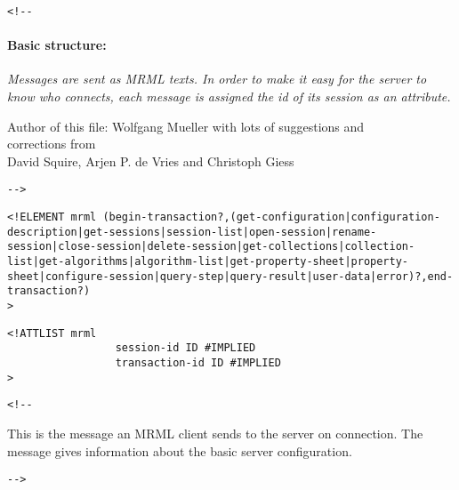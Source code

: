 
\begin{verbatim}<!--\end{verbatim}
  
       \paragraph{Basic structure:}
       {\em
       Messages are sent as MRML texts.
       In  order to make it easy for the server to know who connects,
       each message is assigned the id of its session as an attribute.
       }

     \begin{center}
      Author of this file: 
      Wolfgang Mueller with lots of suggestions and \\
                                   corrections from \\
      David Squire, Arjen P. de Vries and Christoph Giess \\
     \end{center}
       
 \begin{verbatim}-->\end{verbatim}



\begin{verbatim}
<!ELEMENT mrml (begin-transaction?,(get-configuration|configuration-description|get-sessions|session-list|open-session|rename-session|close-session|delete-session|get-collections|collection-list|get-algorithms|algorithm-list|get-property-sheet|property-sheet|configure-session|query-step|query-result|user-data|error)?,end-transaction?) 
>\end{verbatim}

\begin{verbatim}
<!ATTLIST mrml 
                 session-id ID #IMPLIED
                 transaction-id ID #IMPLIED
>\end{verbatim}

\begin{verbatim}<!--\end{verbatim}
  




This is the message an MRML client sends to the server on connection.
The message  gives information about the basic server configuration.

       
 \begin{verbatim}-->\end{verbatim}



